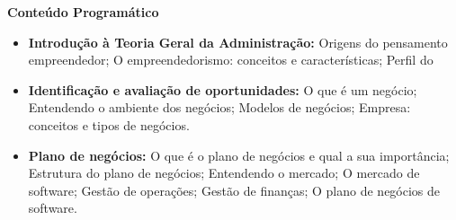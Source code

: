 
\begin{snugshade}\begin{center}\textbf{
    Conteúdo Programático
}\end{center}\end{snugshade}

\begin{itemize}

\item \textbf{Introdução à Teoria Geral da Administração:}
Origens do pensamento empreendedor; O empreendedorismo: conceitos e características; Perfil do %

\item \textbf{Identificação e avaliação de oportunidades:}
O que é um negócio; Entendendo o ambiente dos negócios; Modelos de negócios; Empresa: conceitos e tipos de negócios.

\item \textbf{Plano de negócios:} 
O que é o plano de negócios e qual a sua importância; Estrutura do plano de negócios; Entendendo o mercado; O mercado de software; Gestão de operações; Gestão de finanças; O plano de negócios de software.

\end{itemize}






